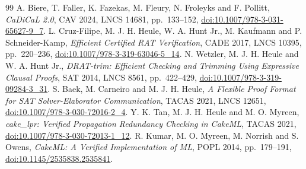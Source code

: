 \documentclass[11pt]{article}
\begin{document}
\begin{thebibliography}{99}
 A. Biere, T. Faller, K. Fazekas, M. Fleury, N. Froleyks and F. Pollitt, \emph{CaDiCaL 2.0}, CAV 2024, LNCS 14681, pp.~133--152, \href{https://doi.org/10.1007/978-3-031-65627-9_7}{doi:10.1007/978-3-031-65627-9\_7}.
 L. Cruz-Filipe, M. J. H. Heule, W. A. Hunt Jr., M. Kaufmann and P. Schneider-Kamp, \emph{Efficient Certified RAT Verification}, CADE 2017, LNCS 10395, pp.~220--236, \href{https://doi.org/10.1007/978-3-319-63046-5_14}{doi:10.1007/978-3-319-63046-5\_14}.
 N. Wetzler, M. J. H. Heule and W. A. Hunt Jr., \emph{DRAT-trim: Efficient Checking and Trimming Using Expressive Clausal Proofs}, SAT 2014, LNCS 8561, pp.~422--429, \href{https://doi.org/10.1007/978-3-319-09284-3_31}{doi:10.1007/978-3-319-09284-3\_31}.
 S. Baek, M. Carneiro and M. J. H. Heule, \emph{A Flexible Proof Format for SAT Solver-Elaborator Communication}, TACAS 2021, LNCS 12651, \href{https://doi.org/10.1007/978-3-030-72016-2_4}{doi:10.1007/978-3-030-72016-2\_4}.
 Y. K. Tan, M. J. H. Heule and M. O. Myreen, \emph{cake\_lpr: Verified Propagation Redundancy Checking in CakeML}, TACAS 2021, \href{https://doi.org/10.1007/978-3-030-72013-1_12}{doi:10.1007/978-3-030-72013-1\_12}.
 R. Kumar, M. O. Myreen, M. Norrish and S. Owens, \emph{CakeML: A Verified Implementation of ML}, POPL 2014, pp.~179--191, \href{https://doi.org/10.1145/2535838.2535841}{doi:10.1145/2535838.2535841}.
\end{thebibliography}
\end{document}
